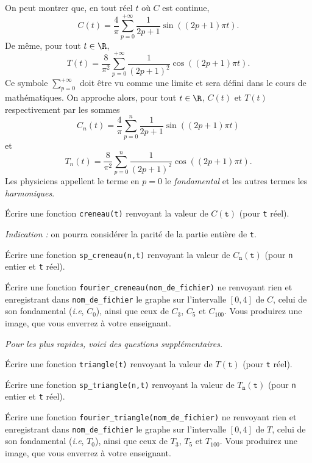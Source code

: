 On peut montrer que, en tout réel $t$ où $C$ est continue, 
\begin{equation*}
  C(t) = \dfrac{4}{\pi}\sum_{p=0}^{+\infty} \dfrac{1}{2p+1} \sin((2p+1)\pi t).
\end{equation*}
De même, pour tout $t\in\R$, 
\begin{equation*}
  T(t) = \dfrac{8}{\pi^2}\sum_{p=0}^{+\infty} \dfrac{1}{(2p+1)^2} \cos((2p+1)\pi t).
\end{equation*}
Ce symbole $\displaystyle \sum_{p=0}^{+\infty}$ doit être vu comme une limite et sera défini dans le cours de mathématiques. 
On approche alors, pour tout $t\in\R$, $C(t)$ et $T(t)$ respectivement par les sommes 
\begin{equation*}
  C_n(t) = \dfrac{4}{\pi}\sum_{p=0}^{n} \dfrac{1}{2p+1} \sin((2p+1)\pi t)
\end{equation*}
et 
\begin{equation*}
   T_n(t) = \dfrac{8}{\pi^2}\sum_{p=0}^{n} \dfrac{1}{(2p+1)^2} \cos((2p+1)\pi t).
\end{equation*}
Les physiciens appellent le terme en $p=0$ le \emph{fondamental} et les autres termes les \emph{harmoniques}. 


\medskip{}

\question{} \'Ecrire une fonction \texttt{creneau(t)} renvoyant la valeur de $C(\texttt{t})$ (pour \texttt{t} réel). 

\emph{Indication :} on pourra considérer la parité de la partie entière de \texttt{t}.


\medskip{}

\question{} \'Ecrire une fonction \texttt{sp\_creneau(n,t)} renvoyant la valeur de $C_{\texttt{n}}(\texttt{t})$ (pour \texttt{n} entier et \texttt{t} réel). 


\question{}\label{tp05:qu:creneau} \'Ecrire une fonction \texttt{fourier\_creneau(nom\_de\_fichier)} ne renvoyant rien 
et enregistrant dans \texttt{nom\_de\_fichier} le graphe sur l'intervalle $[0,4]$ de $C$, celui 
de son fondamental (\emph{i.e}, $C_0$), ainsi que ceux de $C_3$, $C_5$ et $C_{100}$.
Vous produirez une image, que vous enverrez à votre enseignant. 

\bigskip

\emph{Pour les plus rapides, voici des questions supplémentaires.}

\bigskip



\question{} \'Ecrire une fonction \texttt{triangle(t)} renvoyant la valeur de $T(\texttt{t})$ (pour 
\texttt{t} réel).


\medskip{}

\question{} \'Ecrire une fonction \texttt{sp\_triangle(n,t)} renvoyant la valeur de $T_{\texttt{n}}(\texttt{t})$ (pour \texttt{n} entier et \texttt{t} réel). 


\medskip{}

\question{}\label{tp05:qu:triangle} \'Ecrire une fonction \texttt{fourier\_triangle(nom\_de\_fichier)} ne renvoyant rien et enregistrant dans \texttt{nom\_de\_fichier} le graphe sur l'intervalle $[0,4]$ de $T$, celui de son fondamental (\emph{i.e}, $T_0$), ainsi que ceux de $T_3$, $T_5$ et $T_{100}$.
Vous produirez une image, que vous enverrez à votre enseignant. 